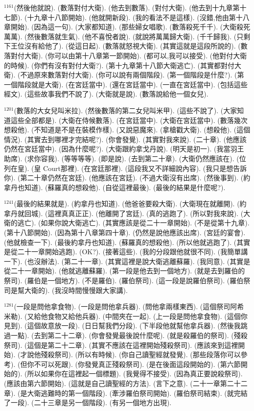 \documentclass{book}
\begin{document}
$^{1161}$(然後他就說).
(數落對付大衛).
(他去到數落).
(對付大衛).
(他去到十九章第十七節).
(十九章十八節開始).
(他就開新段).
(我的看法不是這樣).
(沒錯,他由第十八章開始).
(因為這一句).
(大家都知道).
(那些婦女唱歌).
(數落殺死千千).
(大衛殺死萬萬).
(然後數落就生氣).
(他不喜悅者說).
(就說將萬萬歸大衛).
(千千歸我).
(只剩下王位沒有給他了).
(從這日起).
(數落就怒視大衛).
(其實這就是這段所說的).
(數落對付大衛).
(你可以由第十八章第一節開始).
(都可以,我可以接受).
(他對付大衛的時候).
(你們有沒有對付大衛?).
(第十九章第十八節大衛逃亡).
(其實都對付大衛).
(不過原來數落對付大衛).
(你可以說有兩個階段).
(第一個階段是什麼?).
(第一個階段就是大衛).
(在宮廷當中).
(還在宮廷當中).
(一直在宮廷當中).
(包括這些經文).
(這些故事我們不說了).
(大衛就是說).
(數落說給他一個女兒).

$^{1201}$(數落的大女兒叫米拉).
(然後數落的第二女兒叫米甲).
(這些不說了).
(大家知道這些全部都是).
(大衛在侍候數落).
(在宮廷當中).
(大衛在宮廷當中).
(數落幾次想殺他).
(不知道是不是在裝模作樣).
(又說惡魔來).
(拿槍戳大衛).
(想殺他).
(這個情況).
(其實去到哪裡才完結呢?).
(你會發覺).
(其實對我來說).
(二十章).
(他應該仍然在宮廷當中).
(因為什麼呢?).
(大衛跟約拿戈丹說).
(明天是初一).
(我當羽王助席).
(求你容我).
(等等等等).
(即是說).
(去到第二十章).
(大衛仍然應該在).
(位列在皇).
(皇 Court那裡).
(在宮廷那裡).
(這段我又不詳細說內容).
(我只是想告訴你).
(第二十章仍然在宮廷).
(他應該在宮廷).
(不過大衛沒有出席).
(然後事到).
(約拿丹也知道).
(蘇羅真的想殺他).
(自從這裡最後).
(最後的結果是什麼呢?).

$^{1241}$(最後的結果就是).
(約拿丹也知道).
(他爸爸要殺大衛).
(大衛現在就離開).
(約拿丹就回城).
(這裡真真正正).
(他離開了宮廷).
(真的逃跑了).
(所以對我來說).
(大衛的逃亡).
(如果你說大衛逃亡).
(其實應該是從二十一章開始).
(不是從第十九章).
(第十八節開始).
(因為第十八章第四十章).
(仍然是說他應該出席).
(宮廷的宴會).
(他就檢查一下).
(最後約拿丹也知道).
(蘇羅真的想殺他).
(所以他就逃跑了).
(其實是從二十一章開始逃跑).
(OK?).
(接著這些).
(我的分段跟他就很不同).
(我簡單講一下).
(也沒辦法).
(第二十一章).
(其實這裡是說大衛逃離蘇羅).
(我同意).
(其實是從二十一章開始).
(他就逃離蘇羅).
(第一段是他去到一個地方).
(就是去到羅伯的祭司).
(羅伯是一個地方).
(不是羅伯).
(羅伯祭司).
(這一段是說羅伯祭司).
(羅伯祭司是幫大衛的).
(我沒時間慢慢跟大家講).

$^{1281}$(一段是問他拿食物).
(一段是問他拿兵器).
(問他拿兩樣東西).
(這個祭司阿希米勒).
(又給他食物又給他兵器).
(中間夾在一起).
(上一段是問他拿食物).
(這個你見到).
(這個故意放一段).
(日日幫我們分段).
(下半段他就幫他拿兵器).
(然後我跳過一點).
(去到第二十二章).
(你會發覺最後說什麼呢).
(就是殺羅伯的祭司).
(殘殺祭司).
(這個是第二十二章).
(其實不應該在這裡開始殘殺祭司).
(應該來到這裡開始).
(才說他殘殺祭司).
(所以有時候).
(你自己讀聖經就發覺).
(那些段落你可以參考).
(但你不可以死跟).
(你發覺真正殘殺祭司).
(是在後面這段開始的).
(第六節開始的).
(所以如果你在這裡起一個標題).
(我覺得不接受).
(因為真正要說殺祭司).
(應該由第六節開始).
(這就是自己讀聖經的方法).
(言下之意).
(二十一章第二十二章).
(是大衛逃難時的第一個階段).
(牽涉羅伯祭司開始).
(羅伯祭司結束).
(就完結了一段).
(二十三章是另一個階段).
(有另一個地方出現).
\end{document}
